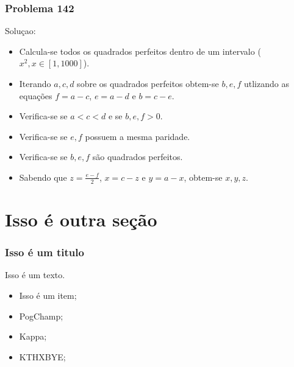 \documentclass{beamer}
\begin{document}
\begin{frame}
    \frametitle{Problema 142}

    Soluçao: \\

    \begin{itemize}
        \item Calcula-se todos os quadrados perfeitos dentro de um intervalo ($x^2, x \in [1, 1000]$).
        \item Iterando $a, c, d$ sobre os quadrados perfeitos obtem-se $b, e, f$ utlizando as equações $f=a-c$, $e=a-d$ e $b=c-e$.
        \item Verifica-se se $a<c<d$ e se $b, e, f > 0$.
        \item Verifica-se se $e, f$ possuem a mesma paridade.
        \item Verifica-se se $b, e, f$ são quadrados perfeitos.
        \item Sabendo que $z=\frac{e-f}{2}$, $x=c-z$ e $y=a-x$, obtem-se $x, y, z$.
    \end{itemize}

    \begin{center}
    \end{center}
\end{frame}


\section{Isso é outra seção}
\begin{frame}
    \frametitle{Isso é um titulo}

    Isso é um texto.
    \begin{itemize}
        \item Isso é um item;
        \item PogChamp;
        \item Kappa;
        \item KTHXBYE;
    \end{itemize}
\end{frame}
\end{document}

